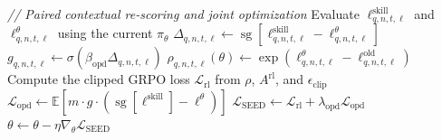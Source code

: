 \begin{algorithm}[t]
\begin{algorithmic}[1]
    \State \textcolor{green!50!black}{\textit{// Paired contextual re-scoring and joint optimization}}
        \State Evaluate $\ell^{\mathrm{skill}}_{q,n,t,\ell}$ and
        $\ell^{\theta}_{q,n,t,\ell}$ using the current $\pi_\theta$
        \State $\Delta_{q,n,t,\ell}\gets
        \operatorname{sg}[\ell^{\mathrm{skill}}_{q,n,t,\ell}
        -\ell^{\theta}_{q,n,t,\ell}]$
        \State $g_{q,n,t,\ell}\gets
        \sigma(\beta_{\mathrm{opd}}\Delta_{q,n,t,\ell})$
        \State $\rho_{q,n,t,\ell}(\theta)\gets
        \exp(\ell^{\theta}_{q,n,t,\ell}
        -\ell^{\mathrm{old}}_{q,n,t,\ell})$
        \State Compute the clipped GRPO loss $\mathcal{L}_{\mathrm{rl}}$
        from $\rho$, $A^{\mathrm{rl}}$, and $\epsilon_{\mathrm{clip}}$
        \State $\mathcal{L}_{\mathrm{opd}}\gets
        \mathbb{E}[m\cdot g\cdot (\operatorname{sg}[\ell^{\mathrm{skill}}]
        -\ell^{\theta})]$
        \State $\mathcal{L}_{\mathrm{SEED}}\gets
        \mathcal{L}_{\mathrm{rl}}
        +\lambda_{\mathrm{opd}}\mathcal{L}_{\mathrm{opd}}$
        \State $\theta\gets\theta-\eta\nabla_\theta
        \mathcal{L}_{\mathrm{SEED}}$
    \EndFor
\EndFor
\end{algorithmic}
\end{algorithm}
